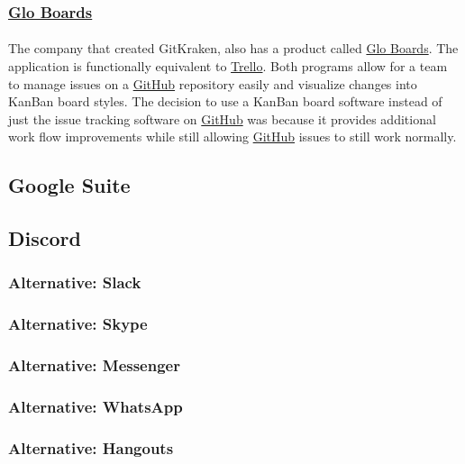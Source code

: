 \documentclass[12pt]{article}
\begin{document}
\subsubsection{\href{https://www.gitkraken.com/glo}{Glo Boards}}
\paragraph{} The company that created GitKraken, also has a product called \href{https://www.gitkraken.com/glo}{Glo Boards}. The application is functionally equivalent to \href{https://trello.com/en}{Trello}. Both programs allow for a team to manage issues on a \href{https://github.com}{GitHub} repository easily and visualize changes into KanBan board styles. The decision to use a KanBan board software instead of just the issue tracking software on \href{https://github.com}{GitHub} was because it provides additional work flow improvements while still allowing \href{https://github.com}{GitHub} issues to still work normally.

\subsection{Google Suite}

\subsection{Discord}

\subsubsection{Alternative: Slack}

\subsubsection{Alternative: Skype}

\subsubsection{Alternative: Messenger}

\subsubsection{Alternative: WhatsApp}

\subsubsection{Alternative: Hangouts}
\end{document}
